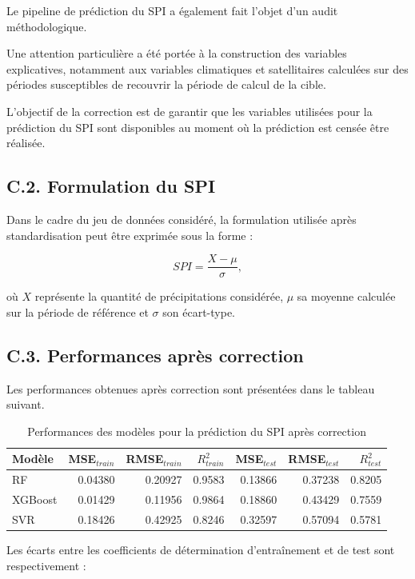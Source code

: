 \documentclass[12pt, a4paper, oneside, french]{report}
\begin{document}
Le pipeline de prédiction du SPI a également fait l'objet d'un audit
méthodologique.

Une attention particulière a été portée à la construction des variables
explicatives, notamment aux variables climatiques et satellitaires calculées
sur des périodes susceptibles de recouvrir la période de calcul de la cible.

L'objectif de la correction est de garantir que les variables utilisées pour
la prédiction du SPI sont disponibles au moment où la prédiction est censée
être réalisée.

\subsection*{C.2. Formulation du SPI}

Dans le cadre du jeu de données considéré, la formulation utilisée après
standardisation peut être exprimée sous la forme :

\begin{equation}
SPI = \frac{X-\mu}{\sigma},
\end{equation}

où $X$ représente la quantité de précipitations considérée, $\mu$ sa moyenne
calculée sur la période de référence et $\sigma$ son écart-type.

\subsection*{C.3. Performances après correction}

Les performances obtenues après correction sont présentées dans le tableau
suivant.

\begin{table}[htbp]
\centering
\caption{Performances des modèles pour la prédiction du SPI après correction}
\begin{tabular}{lrrrrrr}
\hline
Modèle &
MSE$_{train}$ &
RMSE$_{train}$ &
$R^2_{train}$ &
MSE$_{test}$ &
RMSE$_{test}$ &
$R^2_{test}$ \\
\hline
RF &
0.04380 &
0.20927 &
0.9583 &
0.13866 &
0.37238 &
0.8205 \\
XGBoost &
0.01429 &
0.11956 &
0.9864 &
0.18860 &
0.43429 &
0.7559 \\
SVR &
0.18426 &
0.42925 &
0.8246 &
0.32597 &
0.57094 &
0.5781 \\
\hline
\end{tabular}
\end{table}

Les écarts entre les coefficients de détermination d'entraînement et de test
sont respectivement :
\end{document}
